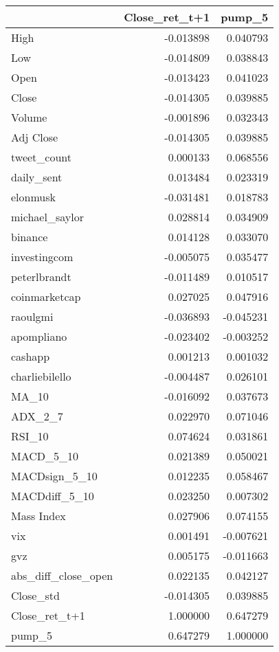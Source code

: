 \begin{tabular}{lrr}
\toprule
{} &  Close\_ret\_t+1 &    pump\_5 \\
\midrule
High                &      -0.013898 &  0.040793 \\
Low                 &      -0.014809 &  0.038843 \\
Open                &      -0.013423 &  0.041023 \\
Close               &      -0.014305 &  0.039885 \\
Volume              &      -0.001896 &  0.032343 \\
Adj Close           &      -0.014305 &  0.039885 \\
tweet\_count         &       0.000133 &  0.068556 \\
daily\_sent          &       0.013484 &  0.023319 \\
elonmusk            &      -0.031481 &  0.018783 \\
michael\_saylor      &       0.028814 &  0.034909 \\
binance             &       0.014128 &  0.033070 \\
investingcom        &      -0.005075 &  0.035477 \\
peterlbrandt        &      -0.011489 &  0.010517 \\
coinmarketcap       &       0.027025 &  0.047916 \\
raoulgmi            &      -0.036893 & -0.045231 \\
apompliano          &      -0.023402 & -0.003252 \\
cashapp             &       0.001213 &  0.001032 \\
charliebilello      &      -0.004487 &  0.026101 \\
MA\_10               &      -0.016092 &  0.037673 \\
ADX\_2\_7             &       0.022970 &  0.071046 \\
RSI\_10              &       0.074624 &  0.031861 \\
MACD\_5\_10           &       0.021389 &  0.050021 \\
MACDsign\_5\_10       &       0.012235 &  0.058467 \\
MACDdiff\_5\_10       &       0.023250 &  0.007302 \\
Mass Index          &       0.027906 &  0.074155 \\
vix                 &       0.001491 & -0.007621 \\
gvz                 &       0.005175 & -0.011663 \\
abs\_diff\_close\_open &       0.022135 &  0.042127 \\
Close\_std           &      -0.014305 &  0.039885 \\
Close\_ret\_t+1       &       1.000000 &  0.647279 \\
pump\_5              &       0.647279 &  1.000000 \\
\bottomrule
\end{tabular}
